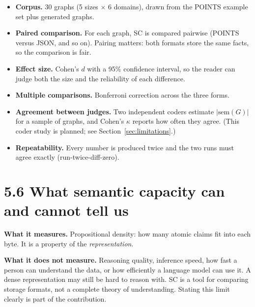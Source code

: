 \begin{itemize}
\item \textbf{Corpus.} 30 graphs (5 sizes $\times$ 6 domains), drawn from the POINTS example set plus generated graphs.
\item \textbf{Paired comparison.} For each graph, SC is compared pairwise (POINTS versus JSON, and so on). Pairing matters: both formats store the same facts, so the comparison is fair.
\item \textbf{Effect size.} Cohen's $d$ with a 95\% confidence interval, so the reader can judge both the size and the reliability of each difference.
\item \textbf{Multiple comparisons.} Bonferroni correction across the three forms.
\item \textbf{Agreement between judges.} Two independent coders estimate $|\text{sem}(G)|$ for a sample of graphs, and Cohen's $\kappa$ reports how often they agree. (This coder study is planned; see Section~\ref{sec:limitations}.)
\item \textbf{Repeatability.} Every number is produced twice and the two runs must agree exactly (run-twice-diff-zero).
\end{itemize}

\section*{5.6 What semantic capacity can and cannot tell us}

\textbf{What it measures.} Propositional density: how many atomic claims fit into each byte. It is a property of the \textit{representation}.

\textbf{What it does not measure.} Reasoning quality, inference speed, how fast a person can understand the data, or how efficiently a language model can use it. A dense representation may still be hard to reason with. SC is a tool for comparing storage formats, not a complete theory of understanding. Stating this limit clearly is part of the contribution.
